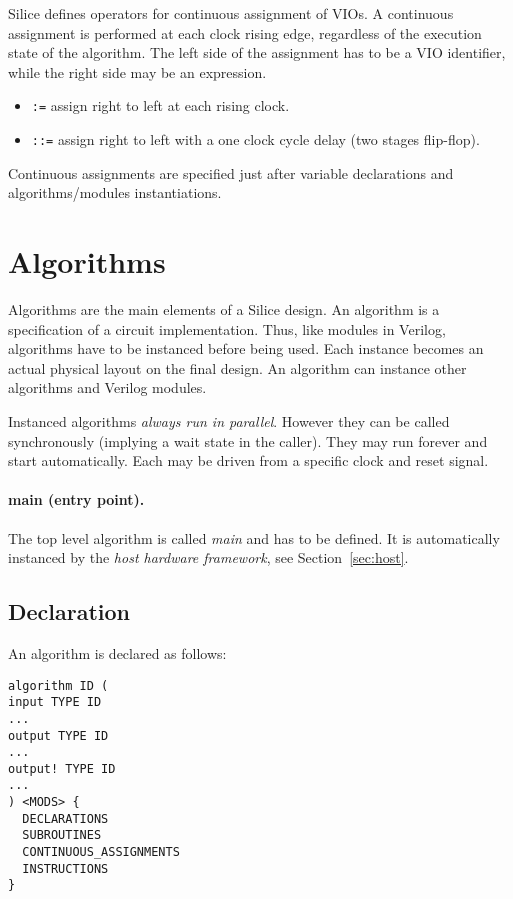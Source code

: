 \documentclass[a4]{article}
\newcommand\verilog{Verilog}
\newcommand\silice{Silice}
\begin{document}
\silice{} defines operators for continuous assignment of VIOs.
A continuous assignment is performed at each clock rising edge, regardless of the 
execution state of the algorithm. The left side of the assignment has to be a VIO identifier,
while the right side may be an expression.
\begin{itemize}
\item \texttt{:=} assign right to left at each rising clock.
\item \texttt{::=} assign right to left with a one clock cycle delay (two stages flip-flop).
\end{itemize}

Continuous assignments are specified just after variable declarations and algorithms/modules instantiations.


\section{Algorithms}

Algorithms are the main elements of a \silice{} design. An algorithm is a specification of a circuit implementation. Thus, like modules in \verilog{}, algorithms have to be instanced before being used. Each instance becomes an actual physical layout on the final design.
An algorithm can instance other algorithms and \verilog{} modules. 

Instanced algorithms \textit{always run in parallel}. However they can be called synchronously (implying a wait state in the caller). They may run forever and start automatically. Each may be driven from a specific clock and reset signal.

\paragraph{main (entry point).}
The top level algorithm is called \textit{main} and has to be defined. It is automatically instanced by the \textit{host hardware framework}, see Section~\ref{sec:host}.


\subsection{Declaration}

An algorithm is declared as follows:
\begin{verbatim}
algorithm ID (
input TYPE ID
...
output TYPE ID
...
output! TYPE ID
...
) <MODS> {
  DECLARATIONS
  SUBROUTINES
  CONTINUOUS_ASSIGNMENTS
  INSTRUCTIONS
}
\end{verbatim}
\end{document}
